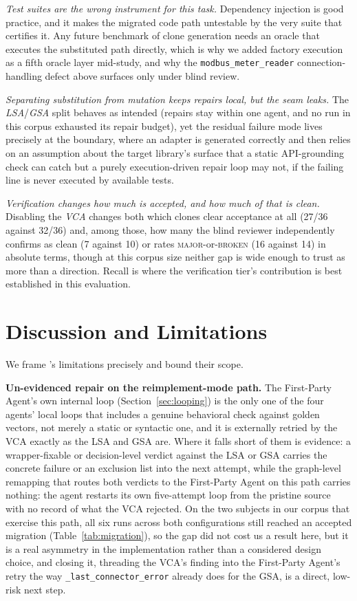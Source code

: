 \emph{Test suites are the wrong instrument for this task.} Dependency injection is good practice, and it makes the migrated code path untestable by the very suite that certifies it. Any future benchmark of clone generation needs an oracle that executes the substituted path directly, which is why we added factory execution as a fifth oracle layer mid-study, and why the \texttt{modbus\_meter\_reader} connection-handling defect above surfaces only under blind review.

\emph{Separating substitution from mutation keeps repairs local, but the seam leaks.} The \emph{LSA}/\emph{GSA} split behaves as intended (repairs stay within one agent, and no run in this corpus exhausted its repair budget), yet the residual failure mode lives precisely at the boundary, where an adapter is generated correctly and then relies on an assumption about the target library's surface that a static API-grounding check can catch but a purely execution-driven repair loop may not, if the failing line is never executed by available tests.

\emph{Verification changes how much is accepted, and how much of that is clean.} Disabling the \emph{VCA} changes both which clones clear acceptance at all (27/36 against 32/36) and, among those, how many the blind reviewer independently confirms as clean (7 against 10) or rates \textsc{major}-or-\textsc{broken} (16 against 14) in absolute terms, though at this corpus size neither gap is wide enough to trust as more than a direction. Recall is where the verification tier's contribution is best established in this evaluation.

\section{Discussion and Limitations}
\label{sec:limitations}

We frame \sys's limitations precisely and bound their scope.

\textbf{Un-evidenced repair on the reimplement-mode path.}
The First-Party Agent's own internal loop (Section~\ref{sec:looping}) is the only one of the four agents' local loops that includes a genuine behavioral check against golden vectors, not merely a static or syntactic one, and it is externally retried by the VCA exactly as the LSA and GSA are. Where it falls short of them is evidence: a wrapper-fixable or decision-level verdict against the LSA or GSA carries the concrete failure or an exclusion list into the next attempt, while the graph-level remapping that routes both verdicts to the First-Party Agent on this path carries nothing: the agent restarts its own five-attempt loop from the pristine source with no record of what the VCA rejected. On the two subjects in our corpus that exercise this path, all six runs across both configurations still reached an accepted migration (Table~\ref{tab:migration}), so the gap did not cost us a result here, but it is a real asymmetry in the implementation rather than a considered design choice, and closing it, threading the VCA's finding into the First-Party Agent's retry the way \texttt{\_last\_connector\_error} already does for the GSA, is a direct, low-risk next step.

